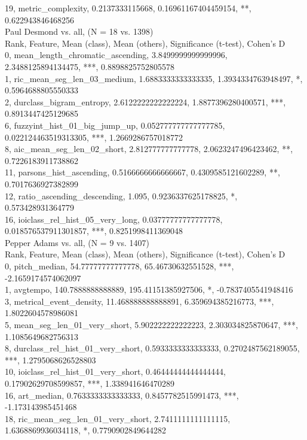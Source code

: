 19, metric_complexity, 0.2137333115668, 0.16961167404459154, **, 0.622943846468256\\
Paul Desmond vs. all, (N = 18 vs. 1398)\\
Rank, Feature, Mean (class), Mean (others), Significance (t-test), Cohen's D\\
0, mean_length_chromatic_ascending, 3.8499999999999996, 2.3488125894134475, ***, 0.8898825752805578\\
1, ric_mean_seg_len_03_medium, 1.6883333333333335, 1.3934334763948497, *, 0.5964688805550333\\
2, durclass_bigram_entropy, 2.6122222222222224, 1.8877396280400571, ***, 0.8913447425129685\\
6, fuzzyint_hist_01_big_jump_up, 0.052777777777777785, 0.022124463519313305, ***, 1.2669286757018772\\
8, aic_mean_seg_len_02_short, 2.812777777777778, 2.0623247496423462, **, 0.7226183911738862\\
11, parsons_hist_ascending, 0.5166666666666667, 0.4309585121602289, **, 0.7017636927382899\\
12, ratio_ascending_descending, 1.095, 0.9236337625178825, *, 0.573428931364779\\
16, ioiclass_rel_hist_05_very_long, 0.03777777777777778, 0.018576537911301857, ***, 0.8251998411369048\\
Pepper Adams vs. all, (N = 9 vs. 1407)\\
Rank, Feature, Mean (class), Mean (others), Significance (t-test), Cohen's D\\
0, pitch_median, 54.77777777777778, 65.46730632551528, ***, -2.1659174574062097\\
1, avgtempo, 140.7888888888889, 195.41151385927506, *, -0.7837405541948416\\
3, metrical_event_density, 11.468888888888891, 6.359694385216773, ***, 1.8022604578986081\\
5, mean_seg_len_01_very_short, 5.902222222222223, 2.303034825870647, ***, 1.1085649682756313\\
8, durclass_rel_hist_01_very_short, 0.5933333333333333, 0.2702487562189055, ***, 1.2795068626528803\\
10, ioiclass_rel_hist_01_very_short, 0.46444444444444444, 0.17902629708599857, ***, 1.338941646470289\\
16, art_median, 0.7633333333333333, 0.8457782515991473, ***, -1.173143985451468\\
18, ric_mean_seg_len_01_very_short, 2.7411111111111115, 1.6368869936034118, *, 0.7790902849644282\\
